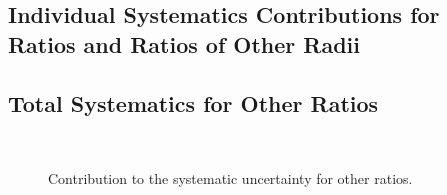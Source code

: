\documentclass[ALICE]{ALICE_analysis_notes}
\begin{document}
\begin{appendix}
\newpage

\section{Individual Systematics Contributions for Ratios and Ratios of Other Radii}
\label{sec:AppendixSystematicsRatiospPb}

\subsection{Total Systematics for Other Ratios}
\label{subsec:appendixTotalSystematicsRatiospPb}

\begin{figure}[h!]
    \centering
    \qquad
    \\
    \caption{Contribution to the systematic uncertainty for other ratios.}
    \label{fig:TotalSysRatiosOtherRpPb}
\end{figure}


\end{appendix}
\end{document}
